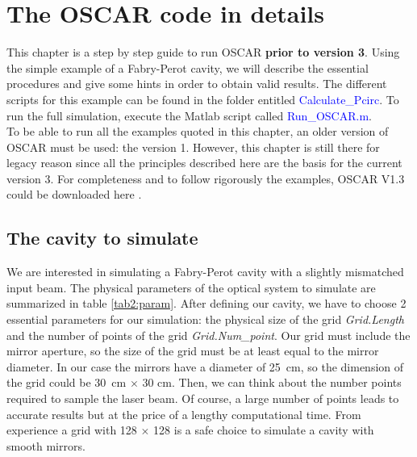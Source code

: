 \chapter{The OSCAR code in details}
\label{chap2}

This chapter is a step by step guide to run OSCAR \textbf{prior to version 3}. Using the simple example of a Fabry-Perot cavity, we will describe the essential procedures and give some hints in order to obtain valid results. The different scripts for this example can be found in the folder entitled \textcolor{blue}{Calculate\_Pcirc}. To run the full simulation, execute the Matlab script called \textcolor{blue}{Run\_OSCAR.m}.\\

To be able to run all the examples quoted in this chapter, an older version of OSCAR must be used: the version 1. However, this chapter is still there for legacy reason since all the principles described here are the basis for the current version 3. For completeness and to follow rigorously the examples, OSCAR V1.3 could be downloaded here \cite{OS_down}.


\section{The cavity to simulate}
\label{chap2:1}
We are interested in simulating a Fabry-Perot cavity with a slightly mismatched input beam. The physical parameters of the optical system to simulate are summarized in table \ref{tab2:param}. After defining our cavity, we have to choose 2 essential parameters for our simulation: the physical size of the grid \textsl{Grid.Length} and the number of points of the grid \textsl{Grid.Num\_point}. Our grid must include the mirror aperture, so the size of the grid must be at least equal to the mirror diameter. In our case the mirrors have a diameter of 25~cm, so the dimension of the grid could be 30~cm $\times$ 30 cm. Then, we can think about the number points required to sample the laser beam. Of course, a large number of points leads to accurate results but at the price of a lengthy computational time. From experience a grid with 128 $\times$ 128 is a safe choice to simulate a cavity with smooth mirrors.


